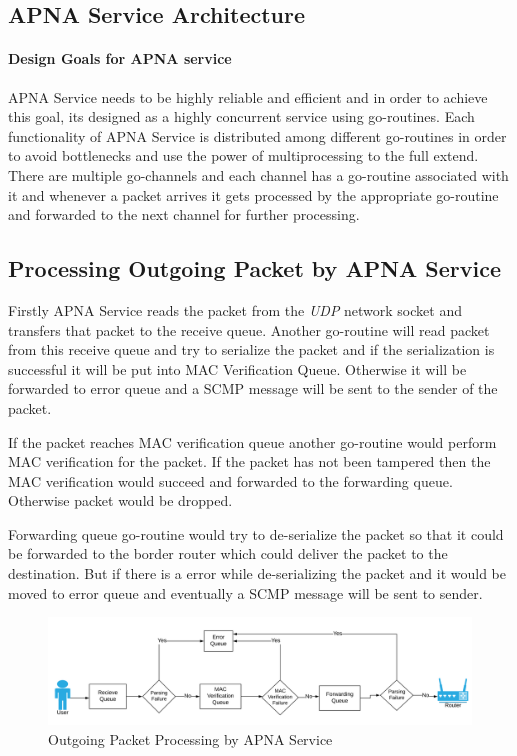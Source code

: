 \subsection{APNA Service Architecture}
\paragraph{Design Goals for APNA service}
APNA Service needs to be highly reliable and efficient and in order to achieve this goal, its designed as a highly concurrent service using go-routines. Each functionality of APNA Service is distributed among different go-routines in order to avoid bottlenecks and use the power of multiprocessing to the full extend. There are multiple go-channels and each channel has a go-routine associated with it and whenever a packet arrives it gets processed by the appropriate go-routine and forwarded to the next channel for further processing.

\subsection{Processing Outgoing Packet by APNA Service} \label{apna_service:out}
Firstly APNA Service reads the packet from the \textit{UDP} network socket and transfers that packet to the receive queue. Another go-routine will read packet from this receive queue and try to serialize the packet and if the serialization is successful it will be put into MAC Verification Queue. Otherwise it will be forwarded to error queue and a SCMP message will be sent to the sender of the packet.

If the packet reaches MAC verification queue another go-routine would perform MAC verification for the packet. If the packet has not been tampered then the MAC verification would succeed and forwarded to the forwarding queue. Otherwise packet would be dropped.

Forwarding queue go-routine would try to de-serialize the packet so that it could be forwarded to the border router which could deliver the packet to the destination. But if there is a error while de-serializing the packet and it would be moved to error queue and eventually a SCMP message will be sent to sender.
\begin{figure}[th!!]
\centering
\hspace*{-2cm}\includegraphics[scale=0.3]{Figures/svc.png}
\decoRule
\caption[APNA Service Outgoing Packet]{Outgoing Packet Processing by APNA Service}
\label{fig:apna_svc_out}
\end{figure}

